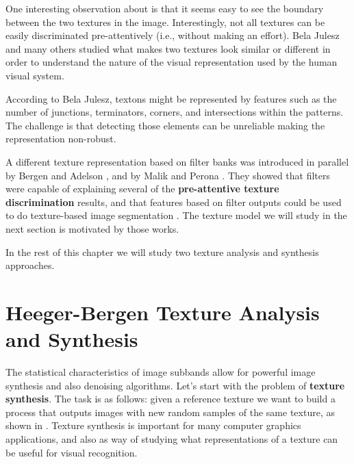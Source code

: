 {%

One interesting observation about \fig{\ref{fig:julez_texture}} is that it seems easy to see the boundary between the two textures in the image. Interestingly, not all textures can be easily discriminated pre-attentively (i.e., without making an effort). Bela Julesz and many others studied what makes two textures look similar or different in order to understand the nature of the visual representation used by the human visual system.

According to Bela Julesz, textons might be represented by features such as the number of junctions, terminators, corners, and intersections within the patterns. The challenge is that detecting those elements can be unreliable making the representation non-robust.

A different texture representation based on filter banks was introduced in parallel by Bergen and Adelson \cite{Bergen88}, and by Malik and Perona \cite{Malik90}. They showed that filters were capable of explaining several of the {\bf pre-attentive texture discrimination} results, and that features based on filter outputs could be used to do texture-based image segmentation \cite{Malik90}. The texture model we will study in the next section is motivated by those works. 


In the rest of this chapter we will study two texture analysis and synthesis approaches.


\section{Heeger-Bergen Texture Analysis and Synthesis}
\label{section:Heeger_Bergen}
The statistical characteristics of image subbands allow for powerful image synthesis and also denoising algorithms. Let's start with the problem of {\bf texture synthesis}. The task is as follows: given a reference texture we want to build a process that outputs images with new random samples of the same texture, as shown in \fig{\ref{fig:analysis_heeger_bergen}}. Texture synthesis is important for many computer graphics applications, and also as way of studying what representations of a texture can be useful for visual recognition. 


}
